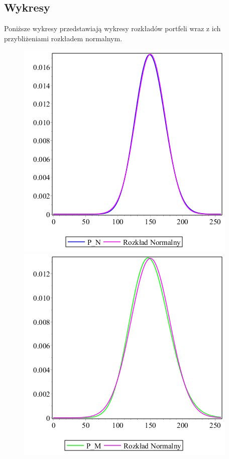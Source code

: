 \documentclass[12pt]{article}
\theoremstyle{twierdzenie}
\theoremstyle{definition}
\begin{document}
\subsection{Wykresy}
Poniższe wykresy przedstawiają wykresy rozkładów portfeli wraz z ich przybliżeniami rozkładem normalnym.
\begin{figure}[H]
\includegraphics[scale=.5]{normalnydlaN}
\includegraphics[scale=.5]{normalnydlaM}
\begin{center}

\end{center}
\end{figure}
\end{document}
